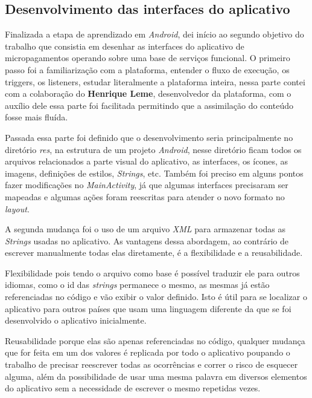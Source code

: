 \documentclass[hidelinks,12pt]{article}
\begin{document}
\subsection{Desenvolvimento das interfaces do aplicativo} \label{dev}

Finalizada a etapa de aprendizado em \textit{Android}, dei in\'icio ao segundo objetivo do trabalho que consistia em desenhar as interfaces do aplicativo de micropagamentos operando sobre uma base de servi\c{c}os funcional. O primeiro passo foi a familiariza\c{c}\~ao com a plataforma, entender o fluxo de execu\c{c}\~ao, os triggers, os listeners, estudar literalmente a plataforma inteira, nessa parte contei com a colabora\c{c}\~ao do \textbf{Henrique Leme}, desenvolvedor da plataforma, com o aux\'ilio dele essa parte foi facilitada permitindo que a assimila\c{c}\~ao do conteúdo fosse mais flu\'ida.

Passada essa parte foi definido que o desenvolvimento seria principalmente no diret\'orio \textit{res}, na estrutura de um projeto \textit{Android}, nesse diret\'orio ficam todos os arquivos relacionados a parte visual do aplicativo, as interfaces, os \'icones, as imagens, defini\c{c}\~oes de estilos, \textit{Strings}, etc. Tamb\'em foi preciso em alguns pontos fazer modifica\c{c}\~oes no \textit{MainActivity}, j\'a que algumas interfaces precisaram ser mapeadas e algumas a\c{c}\~oes foram reescritas para atender o novo formato no \textit{layout}.

A segunda mudan\c{c}a foi o uso de um arquivo \textit{XML} para armazenar todas as \textit{Strings} usadas no aplicativo. As vantagens dessa abordagem, ao contr\'ario de escrever manualmente todas elas diretamente, \'e a flexibilidade e a reusabilidade.

Flexibilidade pois tendo o arquivo como base \'e poss\'ivel traduzir ele para outros idiomas, como o id das \textit{strings} permanece o mesmo, as mesmas j\'a est\~ao referenciadas no c\'odigo e v\~ao exibir o valor definido. Isto \'e útil para se localizar o aplicativo para outros pa\'ises que usam uma linguagem diferente da que se foi desenvolvido o aplicativo inicialmente.

Reusabilidade porque elas s\~ao apenas referenciadas no c\'odigo, qualquer mudan\c{c}a que for feita em um dos valores \'e replicada por todo o aplicativo poupando o trabalho de precisar reescrever todas as ocorrências e correr o risco de esquecer alguma, al\'em da possibilidade de usar uma mesma palavra em diversos elementos do aplicativo sem a necessidade de escrever o mesmo repetidas vezes.
\end{document}

